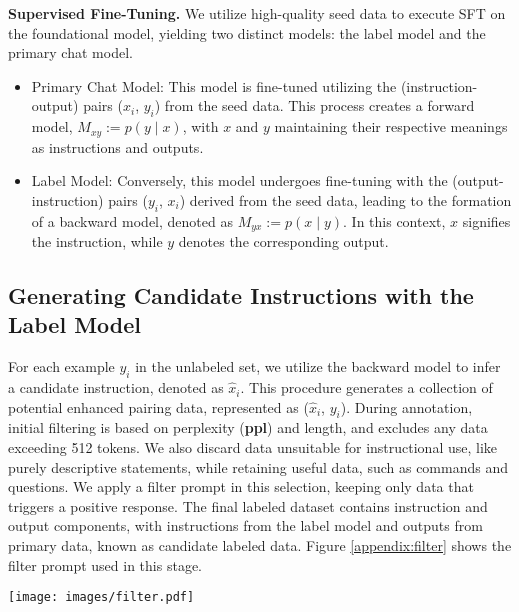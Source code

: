 \noindent
\textbf{Supervised Fine-Tuning.} We utilize high-quality seed data to execute SFT on the foundational model, yielding two distinct models: the label model and the primary chat model.
\begin{itemize}

    \item Primary Chat Model: This model is fine-tuned utilizing the (instruction-output) pairs {(${x}_{i}$, ${y}_{i}$)} from the seed data. This process creates a forward model, $M_{xy} := p(y \mid x)$, with $x$ and $y$ maintaining their respective meanings as instructions and outputs.

   \item Label Model: Conversely, this model undergoes fine-tuning with the (output-instruction) pairs {(${y}_{i}$, ${x}_{i}$)} derived from the seed data, leading to the formation of a backward model, denoted as $M_{yx} := p(x \mid y)$. In this context, $x$ signifies the instruction, while $y$ denotes the corresponding output.
   
\end{itemize}

\subsection{Generating Candidate Instructions with the Label Model}

For each example ${y}_{i}$ in the unlabeled set, we utilize the backward model to infer a candidate instruction, denoted as $\hat{x}_{i}$. This procedure generates a collection of potential enhanced pairing data, represented as {($\hat{x}_{i}$, ${y}_{i}$)}. During annotation, initial filtering is based on perplexity (\textbf{ppl}) and length, and excludes any data exceeding 512 tokens. We also discard data unsuitable for instructional use, like purely descriptive statements, while retaining useful data, such as commands and questions. We apply a filter prompt in this selection, keeping only data that triggers a positive response. The final labeled dataset contains instruction and output components, with instructions from the label model and outputs from primary data, known as candidate labeled data. Figure \ref{appendix:filter} shows the filter prompt used in this stage.
\begin{figure*}[ht]
  \centering
    \centering
    \texttt{[image: images/filter.pdf]}
  \hfill
    \centering
  \caption{Filter prompt we use to screen out unsuitable content for instructions.}
  \label{appendix:filter}
\end{figure*}

